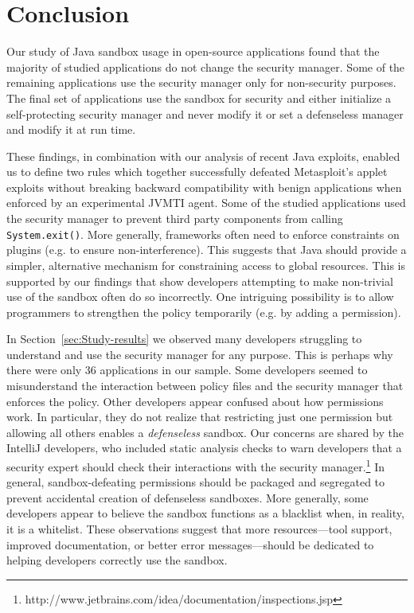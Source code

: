 \documentclass{sig-alternate}
\begin{document}
\section{Conclusion}\label{sec:Conclusion}

Our study of Java sandbox usage in open-source applications found
that the majority of studied applications do not change the security
manager. Some of the remaining applications use the security manager
only for non-security purposes. The final set of applications use
the sandbox for security and either initialize a self-protecting security
manager and never modify it or set a defenseless manager and modify
it at run time. 

These findings, in combination with our analysis of recent Java exploits,
enabled us to define two rules which together successfully
defeated Metasploit's applet exploits without breaking backward compatibility with benign applications when enforced by an experimental JVMTI agent. Some of the studied applications
used the security manager to prevent third party components from calling
\texttt{System.exit()}. More generally, frameworks often need to enforce
constraints on plugins (e.g. to ensure non-interference). This suggests
that Java should provide a simpler, alternative mechanism for constraining
access to global resources. This is supported by our findings that
show developers attempting to make non-trivial use of the sandbox
often do so incorrectly. One intriguing possibility is to allow programmers
to strengthen the policy temporarily (e.g. by adding a permission). 

In Section~\ref{sec:Study-results} we observed many developers struggling to understand and
use the security manager for any purpose. This is perhaps why there
were only 36 applications in our sample. Some developers seemed to
misunderstand the interaction between policy files and the security
manager that enforces the policy. Other developers appear confused
about how permissions work. In particular, they do not realize that
restricting just one permission but allowing all others enables a
\emph{defenseless} sandbox. Our concerns are shared by the IntelliJ developers, who included static analysis checks to warn developers that a security expert should check their interactions with the security manager.\footnote{http://www.jetbrains.com/idea/documentation/inspections.jsp%
} In general, sandbox-defeating permissions
should be packaged and segregated to prevent accidental creation of
defenseless sandboxes. More generally, some developers appear to believe
the sandbox functions as a blacklist when, in reality, it is a whitelist.
These observations suggest that more resources---tool support, improved
documentation, or better error messages---should be dedicated to helping
developers correctly use the sandbox. 



\end{document}
